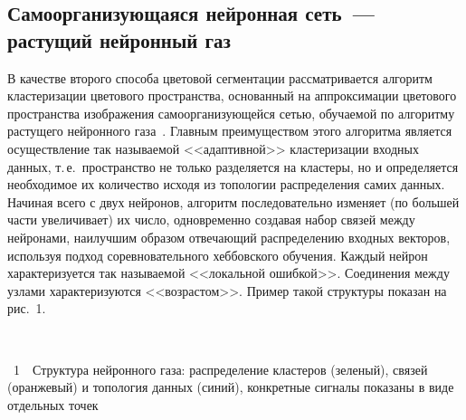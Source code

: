 \begin{multicols}{2}
\section{Самоорганизующаяся нейронная сеть~--- растущий нейронный газ}
      
      В качестве второго способа цветовой сег\-мен\-тации рассматривается алгоритм 
кластеризации цвето\-во\-го пространства, основанный на аппроксимации цветового пространства 
изображения самоорганизующейся сетью, обучаемой по алгоритму рас\-ту\-ще\-го нейронного 
газа~\cite{14v, 13v}. Главным преимуществом этого алгоритма является осуществление так 
называемой <<адаптивной>> кластеризации входных данных, т.\,е.\ пространство не только 
разделяется на кластеры, но и определяется необходимое их количество исходя из топологии 
распределения самих данных. Начиная всего с двух нейронов, алгоритм последовательно изменяет 
(по большей час\-ти увеличивает) их чис\-ло, одновременно создавая набор связей между нейронами, 
наилучшим образом отвечающий распределению входных векторов, используя подход 
соревновательного хеббовского обучения. Каждый нейрон характеризуется так называемой 
<<локальной ошибкой>>. Соединения между узлами характеризуются <<возрастом>>. Пример 
такой структуры показан на рис.~1.

\begin{center} %
\vspace*{6pt}
\mbox{%
 \epsfxsize=79mm
}
\end{center}
\vspace*{1pt}
{{\figurename~1}\ \ \small{Структура нейронного газа: распределение клас\-теров (зеленый), связей (оранжевый) и 
топология данных (синий), конкретные сигналы показаны в виде отдельных точек}}
\vspace*{6pt}

\addtocounter{figure}{1}


\end{multicols}
